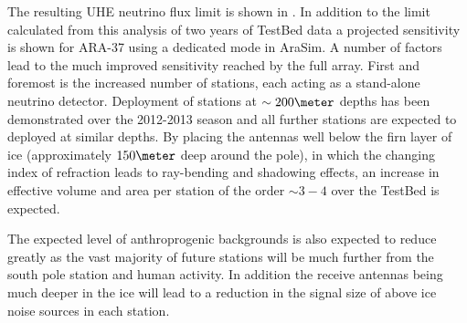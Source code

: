 The resulting UHE neutrino flux limit is shown in . In addition to the limit calculated from this analysis of two years of TestBed data a projected sensitivity is shown for ARA-37 using a dedicated mode in AraSim. A number of factors lead to the much improved sensitivity reached by the full array. First and foremost is the increased number of stations, each acting as a stand-alone neutrino detector. Deployment of stations at $\sim 200 \meter$ depths has been demonstrated over the 2012-2013 season and all further stations are expected to deployed at similar depths. By placing the antennas well below the firn layer of ice (approximately $150 \meter$ deep around the pole), in which the changing index of refraction leads to ray-bending and shadowing effects, an increase in effective volume and area per station of the order $\sim 3 - 4$ over the TestBed is expected.

The expected level of anthroprogenic backgrounds is also expected to reduce greatly as the vast majority of future stations will be much further from the south pole station and human activity. In addition the receive antennas being much deeper in the ice will lead to a reduction in the signal size of above ice noise sources in each station. 


